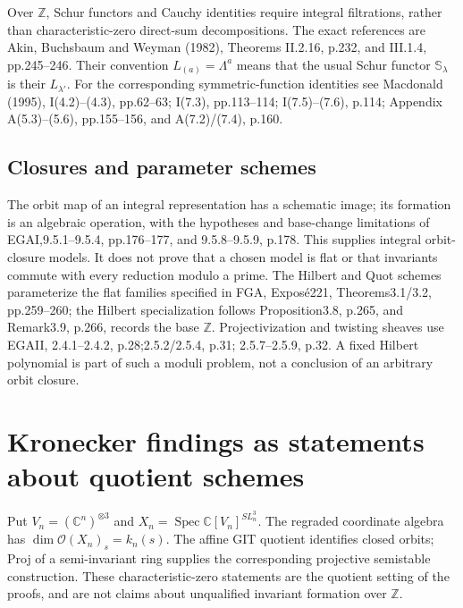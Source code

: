 Over $\mathbb Z$, Schur functors and Cauchy identities require
integral filtrations, rather than characteristic-zero direct-sum
decompositions.  The exact references are Akin, Buchsbaum and
Weyman (1982), Theorems II.2.16, p.232, and III.1.4, pp.245--246.
Their convention $L_{(a)}=\Lambda^a$ means that the usual Schur
functor $\mathbb S_\lambda$ is their $L_{\lambda'}$.
For the corresponding symmetric-function identities see
Macdonald (1995), I(4.2)--(4.3), pp.62--63;
I(7.3), pp.113--114; I(7.5)--(7.6), p.114;
Appendix A(5.3)--(5.6), pp.155--156, and A(7.2)/(7.4), p.160.

\subsection{Closures and parameter schemes}
The orbit map of an integral representation has a schematic image;
its formation is an algebraic operation, with the hypotheses and
base-change limitations of EGAI,9.5.1--9.5.4, pp.176--177, and
9.5.8--9.5.9, p.178.  This supplies integral orbit-closure models.
It does not prove that a chosen model is flat or that invariants
commute with every reduction modulo a prime.  The Hilbert and Quot
schemes parameterize the flat families specified in FGA,
Expos\'e221, Theorems3.1/3.2, pp.259--260; the Hilbert specialization
follows Proposition3.8, p.265, and Remark3.9, p.266, records the
base $\mathbb Z$.  Projectivization and twisting sheaves use EGAII,
2.4.1--2.4.2, p.28;2.5.2/2.5.4, p.31;
2.5.7--2.5.9, p.32.  A fixed Hilbert polynomial is part of such
a moduli problem, not a conclusion of an arbitrary orbit closure.

\section{Kronecker findings as statements about quotient schemes}

Put $V_n=(\mathbb C^n)^{\otimes3}$ and
$X_n=\operatorname{Spec}\mathbb C[V_n]^{SL_n^3}$.
The regraded coordinate algebra has
$\dim\mathcal O(X_n)_s=k_n(s)$.
The affine GIT quotient identifies closed orbits; Proj of a
semi-invariant ring supplies the corresponding projective
semistable construction.  These characteristic-zero statements
are the quotient setting of the proofs, and are not claims about
unqualified invariant formation over $\mathbb Z$.

